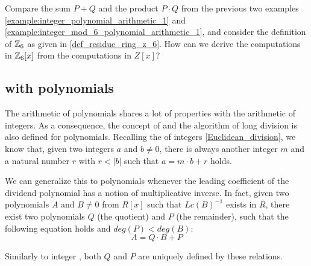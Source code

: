 \begin{exercise}
Compare the sum $P+Q$ and the product $P\cdot Q$ from the previous two examples \ref{example:integer_polynomial_arithmetic_1} and \ref{example:integer_mod_6_polynomial_arithmetic_1}, and consider the definition of $\mathbb{Z}_6$ as given in \examplename{} \ref{def_residue_ring_z_6}. How can we derive the computations in $\mathbb{Z}_6[x]$ from the computations in $Z[x]$?
\end{exercise}
\subsection{ with polynomials}
The arithmetic of polynomials shares a lot of properties with the arithmetic of integers. As a consequence, the concept of  and the algorithm of long division is also defined for polynomials. Recalling the  of integers \ref{Euclidean_division}, we know that, given two integers $a$ and $b\neq 0$, there is always another integer $m$ and a natural number $r$ with $r<|b|$ such that $a = m\cdot b +r$ holds.

We can generalize this to polynomials whenever the leading coefficient of the dividend polynomial has a notion of multiplicative inverse. In fact, given two polynomials $A$ and $B\neq 0$ from $R[x]$ such that $Lc(B)^{-1}$ exists in $R$, there exist two polynomials $Q$ (the quotient) and $P$ (the remainder), such that the following equation holds and $deg(P) < deg(B)$:
\begin{equation}
\label{eq_polynomial_euclidean_division_notation}
A = Q\cdot B + P
\end{equation}

Similarly to integer , both $Q$ and $P$ are uniquely defined by these relations.

